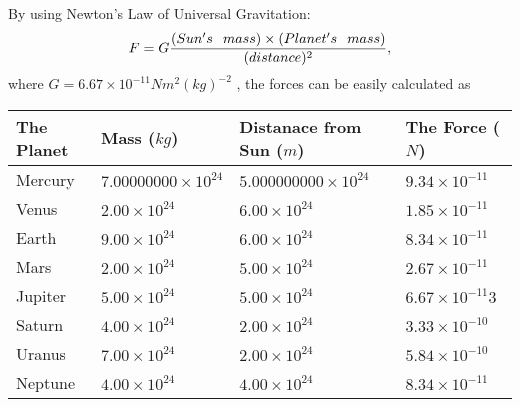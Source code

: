\documentclass[12pt]{article}
\begin{document}
 

 
 
 
 
\noindent{}
 
 

By using Newton's Law of Universal Gravitation:
\[
F=G \frac{(Sun's \hspace{0.1in} mass) \times (Planet's \hspace{0.1in} mass)} { (distance)^2},
\]
where
$ G= %
6.67 \times 10^{-11} N m^{2}(kg)^{-2}$ , the forces can be easily calculated as
 
\vspace{0.2in}
 
 
\begin{tabular}{|l|l|l|l|}
\hline
The Planet & Mass ($kg$) & Distanace from Sun ($m$) & The Force ($N$)\\
\hline
Mercury  &
           $ %
7.00000000 \times 10^{24}  $   &
             $ %
5.000000000 \times 10^{24}$    & $ %
9.34 \times 10^{-11} $
\\  \hline
Venus    &
           $  %
2.00 \times 10^{24}  $     &
             $ %
6.00 \times 10^{24} $    & $ %
1.85 \times 10^{-11} $
\\  \hline
Earth    &
           $  %
9.00 \times 10^{24}$     &
             $ %
6.00 \times 10^{24} $    & $ %
8.34 \times 10^{-11} $
\\   \hline
Mars     &
           $  %
2.00 \times 10^{24} $     &
             $ %
5.00 \times 10^{24}$    & $ %
2.67 \times 10^{-11} $
\\   \hline
Jupiter  &
           $  %
5.00 \times 10^{24}  $    &
             $ %
5.00 \times 10^{24} $    & $ %
6.67 \times 10^{-11}3 $
\\  \hline
Saturn   &
           $  %
4.00 \times 10^{24}   $    &
             $ %
2.00 \times 10^{24}  $    & $ %
3.33 \times 10^{-10} $
\\  \hline
Uranus   &
           $  %
7.00 \times 10^{24} $    &
             $ %
2.00 \times 10^{24}$    & $ %
5.84 \times 10^{-10} $
\\  \hline
Neptune  &
           $  %
4.00 \times 10^{24}  $    &
             $ %
4.00 \times 10^{24} $    & $ %
8.34 \times 10^{-11} $
\\  \hline
 
\end{tabular}
 
 
 
 
\noindent{}
 
\end{document}
